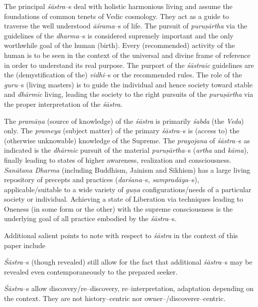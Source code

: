The principal \textit{śāstra}–s deal with holistic harmonious living and assume the foundations of common tenets of Vedic cosmology. They act as a guide to traverse the well understood \textit{āśrama}–s of life. The pursuit of \textit{puruṣārtha} via the guidelines of the \textit{dharma}–s is considered supremely important and the only worthwhile goal of the human (birth). Every (recommended) activity of the human is to be seen in the context of the universal and divine frame of reference in order to understand its real purpose. The purport of the \textit{śāstraic} guidelines are the (demystification of the) \textit{vidhi}–s or the recommended rules. The role of the \textit{guru}–s (living masters) is to guide the individual and hence society toward stable and \textit{dhārmic} living, leading the society to the right pursuits of the \textit{puruṣārtha} via the proper interpretation of the \textit{śāstra}.

The \textit{pramāṇa} (source of knowledge) of the \textit{śāstra} is primarily \textit{śabda} (the \textit{Veda}) only. The \textit{prameya} (subject matter) of the primary \textit{śāstra}–s is (access to) the (otherwise unknowable) knowledge of the Supreme. The \textit{prayojana} of \textit{śāstra}–s as indicated is the \textit{dhārmic} pursuit of the material \textit{puruṣārtha}–s (\textit{artha} and \textit{kāma}), finally leading to states of higher awareness, realization and consciousness. \textit{Sanātana Dharma} (including Buddhism, Jainism and Sikhism) has a large living repository of precepts and practices (\textit{darśana}–s, \textit{sampradāya}–s), applicable/suitable to a wide variety of \textit{guṇa} configurations/needs of a particular society or individual. Achieving a state of Liberation via techniques leading to Oneness (in some form or the other) with the supreme consciousness is the underlying goal of all practice embodied by the \textit{śāstra}–s.

Additional salient points to note with respect to \textit{śāstra} in the context of this paper include

\item \textit{Śāstra}–s (though revealed) still allow for the fact that additional \textit{śāstra}–s may be revealed even contemporaneously to the prepared seeker.

 \item \textit{Śāstra}–s allow discovery/re–discovery, re–interpretation, adaptation depending on the context. They are not history–centric nor owner–/discoverer–centric.

